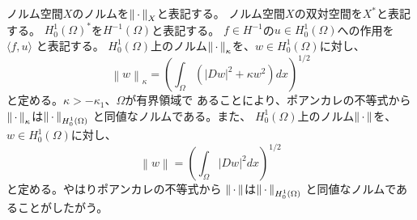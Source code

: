 ノルム空間$X$のノルムを$\left\|\, \cdot \, \right\|_X$と表記する。
ノルム空間$X$の双対空間を$X^*$と表記する。
$H_0^1(\Omega)^*$を$H^{-1}(\Omega)$と表記する。
$f \in H^{-1}$の$u \in H_0^1(\Omega)$への作用を$\langle f, u \rangle$
と表記する。
$H_0^1(\Omega)$上のノルム$\left\|\, \cdot \, \right\|_{\kappa}$を、$w \in H_0^1(\Omega)$に対し、
\[
 \left\| w \right\|_\kappa = \left(\int_\Omega \left( \lvert Dw \rvert^2 +
 \kappa w ^2 \right) dx\right)^{1/2}
\]
と定める。$\kappa > -\kappa_1$、$\Omega$が有界領域で
あることにより、ポアンカレの不等式から
$\left\|\, \cdot \, \right\|_\kappa$は$\left\|\, \cdot \, \right\|_{H_0^1(\Omega)}$
と同値なノルムである。また、
$H_0^1(\Omega)$上のノルム$\left\|\, \cdot \, \right\|$を、$w \in H_0^1(\Omega)$に対し、
\[
 \left\| w \right\| = \left(\int_\Omega \lvert Dw \rvert^2 dx\right)^{1/2}
\]
と定める。やはりポアンカレの不等式から
$\left\|\, \cdot \, \right\|$は$\left\|\, \cdot \, \right\|_{H_0^1(\Omega)}$
と同値なノルムであることがしたがう。

